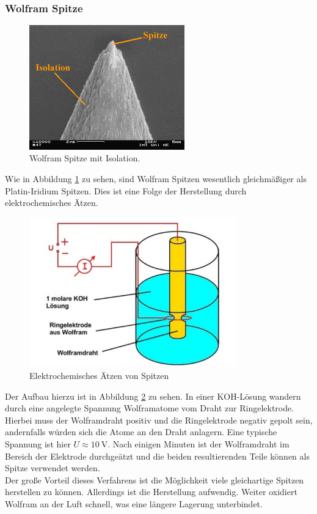         \subsubsection{Wolfram Spitze}

\begin{figure}[h]
    \centering
    \includegraphics[width=0.6\textwidth]{Abb/wolfram.png}
    \caption{Wolfram Spitze mit Isolation. \cite{wolfram}}
    \label{wolfram}
\end{figure}
Wie in Abbildung \ref{wolfram} zu sehen, sind Wolfram Spitzen wesentlich 
gleichmäßiger als Platin-Iridium Spitzen. Dies ist eine Folge der Herstellung
durch elektrochemisches Ätzen. 
\begin{figure}
    \centering
    \includegraphics[width=0.8\textwidth]{Abb/wolf_verf.png}
    \caption{Elektrochemisches Ätzen von Spitzen}
    \label{wolf-verf}
\end{figure}
Der Aufbau hierzu ist in Abbildung \ref{wolf-verf} zu sehen. In einer KOH-Lösung 
wandern durch eine angelegte Spannung Wolframatome vom Draht zur Ringelektrode.
Hierbei muss der Wolframdraht positiv und die Ringelektrode negativ gepolt sein,
andernfalls würden sich die Atome an den Draht anlagern. Eine typische Spannung 
ist hier $U \approx \SI{10}{\volt}$. Nach einigen Minuten ist der Wolframdraht
im Bereich der Elektrode durchgeätzt und die beiden resultierenden Teile können 
als Spitze verwendet werden.\\
Der große Vorteil dieses Verfahrens ist die Möglichkeit viele gleichartige Spitzen
herstellen zu können. Allerdings ist die Herstellung aufwendig. Weiter oxidiert 
Wolfram an der Luft schnell, was eine längere Lagerung unterbindet.

